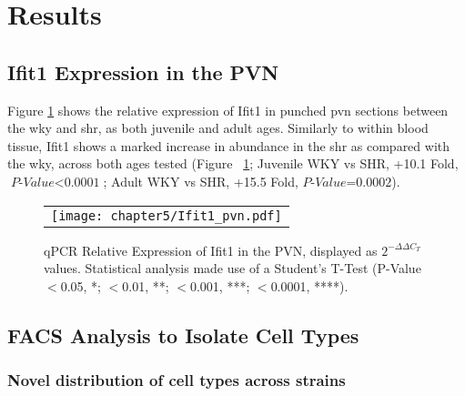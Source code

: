 \section{Results}

\subsection{Ifit1 Expression in the PVN}

Figure \ref{fig:qpcrIfit1PVN} shows the relative expression of Ifit1 in punched \acrshort{pvn} sections between the \acrshort{wky} and \acrshort{shr}, as both juvenile and adult ages. Similarly to within blood tissue, Ifit1 shows a marked increase in abundance in the \acrshort{shr} as compared with the \acrshort{wky}, across both ages tested (Figure ~\ref{fig:qpcrIfit1PVN}; Juvenile WKY vs SHR, +10.1 Fold, $\textit{P-Value$<$0.0001}$; Adult WKY vs SHR, +15.5 Fold, $\textit{P-Value=0.0002}$). 

\begin{figure}[!htbp]
  \centering 
  \begin{tabular}{c}
  \texttt{[image: chapter5/Ifit1\_pvn.pdf]} \\
\end{tabular} 
  \caption[qPCR Relative Expression of Ifit1 in the PVN]{qPCR Relative Expression of Ifit1 in the PVN, displayed as $2^{-\Delta\Delta C_{T}}$ values. Statistical analysis made use of a Student's T-Test (P-Value $<$0.05, *; $<$0.01, **; $<$0.001, ***;  $<$0.0001, ****).}
  \label{fig:qpcrIfit1PVN}
\end{figure}



\subsection{FACS Analysis to Isolate Cell Types}

\subsubsection{Novel distribution of cell types across strains}


